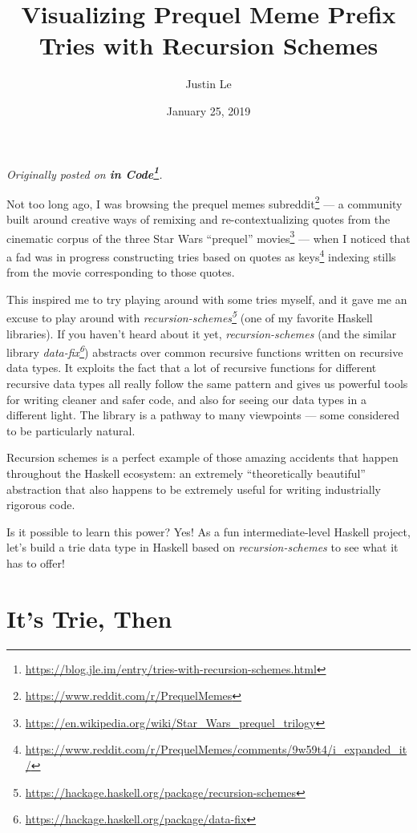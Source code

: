 \documentclass[]{article}
\title{Visualizing Prequel Meme Prefix Tries with Recursion Schemes}
\author{Justin Le}
\date{January 25, 2019}
\renewcommand{\href}[2]{#2\footnote{\url{#1}}}
\begin{document}
\maketitle

\emph{Originally posted on
\textbf{\href{https://blog.jle.im/entry/tries-with-recursion-schemes.html}{in
Code}}.}

Not too long ago, I was browsing the
\href{https://www.reddit.com/r/PrequelMemes}{prequel memes subreddit} --- a
community built around creative ways of remixing and re-contextualizing quotes
from the cinematic corpus of the three
\href{https://en.wikipedia.org/wiki/Star_Wars_prequel_trilogy}{Star Wars
``prequel'' movies} --- when I noticed that a fad was in progress
\href{https://www.reddit.com/r/PrequelMemes/comments/9w59t4/i_expanded_it/}{constructing
tries based on quotes as keys} indexing stills from the movie corresponding to
those quotes.

This inspired me to try playing around with some tries myself, and it gave me an
excuse to play around with
\emph{\href{https://hackage.haskell.org/package/recursion-schemes}{recursion-schemes}}
(one of my favorite Haskell libraries). If you haven't heard about it yet,
\emph{recursion-schemes} (and the similar library
\emph{\href{https://hackage.haskell.org/package/data-fix}{data-fix}}) abstracts
over common recursive functions written on recursive data types. It exploits the
fact that a lot of recursive functions for different recursive data types all
really follow the same pattern and gives us powerful tools for writing cleaner
and safer code, and also for seeing our data types in a different light. The
library is a pathway to many viewpoints --- some considered to be particularly
natural.

Recursion schemes is a perfect example of those amazing accidents that happen
throughout the Haskell ecosystem: an extremely ``theoretically beautiful''
abstraction that also happens to be extremely useful for writing industrially
rigorous code.

Is it possible to learn this power? Yes! As a fun intermediate-level Haskell
project, let's build a trie data type in Haskell based on
\emph{recursion-schemes} to see what it has to offer!

\hypertarget{its-trie-then}{%
\section{It's Trie, Then}\label{its-trie-then}}
\end{document}
